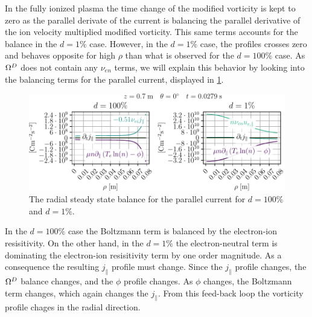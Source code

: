 %
In the fully ionized plasma the time change of the modified vorticity is kept to zero as the parallel derivate of the current is balancing the parallel derivative of the ion velocity multiplied modified vorticity.
This same terms accounts for the balance in the $d=1\%$ case.
However, in the $d=1\%$ case, the profiles crosses zero and behaves opposite for high $\rho$ than what is observed for the $d=100\%$ case.
As $\Omega^D$ does not contain any $\nu_{en}$ terms, we will explain this behavior by looking into the balancing terms for the parallel current, displayed in \cref{fig:nnScanJParRad}.
%
\begin{figure}[htb]
    \centering
    \includegraphics{fig/results/neutral/jParBalanceNnCompareRad}
    \caption{The radial steady state balance for the parallel current for $d=100\%$ and $d=1\%$.}
    \label{fig:nnScanJParRad}
\end{figure}
%
In the $d=100\%$ case the Boltzmann term is balanced by the electron-ion resisitivity.
On the other hand, in the $d=1\%$ the electron-neutral term is dominating the electron-ion resisitivity term by one order magnitude.
As a consequence the resulting $j_\|$ profile must change.
Since the $j_\|$ profile changes, the $\Omega^D$ balance changes, and the $\phi$ profile changes.
As $\phi$ changes, the Boltzmann term changes, which again changes the $j_\|$.
From this feed-back loop the vorticity profile chages in the radial direction.

